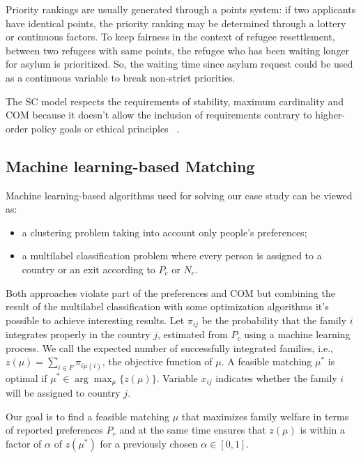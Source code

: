 Priority rankings are usually generated through a points system: if two applicants have identical points, the priority ranking may be determined through a lottery or continuous factors. To keep fairness in the context of refugee resettlement, between two refugees with same points, the refugee who has been waiting longer for asylum is prioritized. So, the waiting time since asylum request could be used as a continuous variable to break non-strict priorities.

The SC model respects the requirements of stability, maximum cardinality and COM because it doesn't allow the inclusion of requirements contrary to higher-order policy goals or ethical principles ~\cite{basshuysen}.


\subsection{Machine learning-based Matching}\label{machine-learning-based-matching}%

Machine learning-based algorithms used for solving our case study can be viewed as:

\begin{itemize}
    \item a clustering problem taking into account only people's preferences;
    \item a multilabel classification problem where every person is assigned to a country or an exit according to \(P_c\) or \(N_e\).
\end{itemize}
Both approaches violate part of the preferences and COM but combining the result of the multilabel classification with some optimization algorithms it's possible to achieve interesting results. Let \(\pi_{ij}\) be the probability that the family \(i\) integrates properly in the country \(j\), estimated from \(P_c\) using a machine learning process. We call the expected number of successfully integrated families, i.e., \(z (\mu) = \sum_{i \in F} \pi_{i \mu (i)}\), the objective function of \(\mu\). A feasible matching \(\mu^*\) is optimal if \(\mu^* \in \arg\max_{\mu} \{z (\mu)\}\). Variable \(x_{ij}\) indicates whether the family \(i\) will be assigned to country \(j\).

Our goal is to find a feasible matching \(\mu\) that maximizes family welfare in terms of reported preferences \(P_r\) and at the same time ensures that \(z (\mu)\) is within a factor of \(\alpha\) of \(z \left( \mu^* \right)\) for a previously chosen \(\alpha \in [0,1]\).

